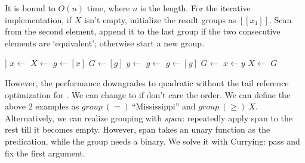 \documentclass[b5paper]{article}
\begin{document}
\be
{}
\ee

It is bound to $O(n)$ time, where $n$ is the length. For the iterative implementation, if $X$ isn't empty, initialize the result groups as $[[x_1]]$. Scan from the second element, append it to the last group if the two consecutive elements are `equivalent'; otherwise start a new group.

\begin{algorithmic}[1]
    \State \Return [[\ ]]
  \EndIf
  \State $x \gets$ 
  \State $X \gets$ 
  \State $g \gets [x]$
  \State $G \gets [g]$
    \State $y \gets$ 
      \State $g \gets $ 
    \Else
      \State $g \gets [y]$
      \State $G \gets$ 
    \EndIf
    \State $x \gets y$
    \State $X \gets$ 
  \EndWhile
  \State \Return $G$
\EndFunction
\end{algorithmic}

However, the performance downgrades to quadratic without the tail reference optimization for . We can change to  if don't care the order. We can define the above 2 examples as $\textit{group}\ (=)\ \text{``Mississippi''}$ and $\textit{group}\ (\geq)\ X$. Alternatively, we can realize grouping with $span$: repeatedly apply span to the rest till it becomes empty. However, span takes an unary function as the predication, while the group needs a binary. We solve it with Currying: pass and fix the first argument.

\be
{}
\ee
\end{document}

